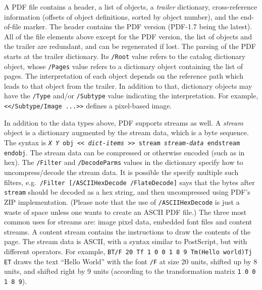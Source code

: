 \documentclass{ltugproc}
\newcommand\DD{\discretionary{\the \textfont 1\char"2E}{}{}}
\begin{document}
A PDF file contains a header, a list of objects, a \emph{trailer}
dictionary, cross-reference information (offsets of object definitions,
sorted by object number), and the end-of-file marker. The header contains
the PDF version (PDF-1.7 being the latest). All of the file elements above
except for the PDF version, the list of objects and the trailer are
redundant, and can be regenerated if lost. The parsing of the PDF starts
at the trailer dictionary. Its \texttt{/Root} value refers to the catalog
dictionary object, whose \texttt{/Pages} value refers to a dictionary object
containing the list of pages. The interpretation of each object depends on
the reference path which leads to that object from the trailer. In addition
to that, dictionary objects may have the \texttt{/Type} and/or
\texttt{/Subtype} value indicating the interpretation. For example,
\texttt{\hbox{<}</Subtype/Image ...\hbox{>}>} defines a pixel-based image.

In addition to the data types above, PDF supports streams as well. A
\emph{stream} object is a dictionary augmented by the stream data, which is
a byte sequence. The syntax is \texttt{\emph{X} \emph{Y} obj <<
\emph{dict-items} >> stream \emph{stream-data} endstream endobj}.
The stream data can be compressed or otherwise encoded
(such as in hex). The \texttt{/Filter} and \texttt{/Decode\DD Parms} values in
the dictionary specify how to uncompress/\allowbreak de\-code the stream data.
It is possible the specify multiple such filters,
e.g.\ \texttt{/Filter [\allowbreak/ASCII\DD Hex\DD Decode /Flate\DD Decode]} says that the bytes
after \texttt{stream} should be decoded as a hex string, and then
uncompressed using PDF's ZIP implementation. (Please note that the use of
\texttt{/ASCII\DD Hex\DD Decode} is just a waste of space unless one wants to create
an ASCII PDF file.) The three most common uses for
streams are: image pixel data, embedded font files and content streams.
A content stream contains the instructions to draw the contents of the
page. The
stream data is ASCII, with a syntax similar to PostScript, but with
different operators. For example, \texttt{BT/F 20 Tf 1 0 0 1 8 9
Tm(Hello world)\allowbreak Tj ET} draws the text ``Hello World''
with the font \texttt{/F} at size 20 units, shifted up by 8 units, and
shifted right by 9 units (according to the transformation matrix
\texttt{1 0 0 1 8 9}).
\end{document}
